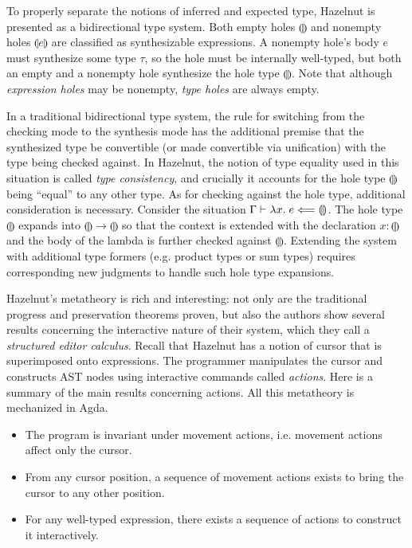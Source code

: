 \newcommand{\hole}[1]{\llparenthesis #1 \rrparenthesis}
To properly separate the notions of inferred and expected type, Hazelnut is
presented as a bidirectional type system.
Both empty holes $\hole{}$ and nonempty holes $\hole{e}$ are classified as
synthesizable expressions.
A nonempty hole's body $e$ must synthesize some type $\tau$, so the hole must be
internally well-typed, but both an empty and a nonempty hole synthesize the hole
type $\hole{}$.
Note that although \emph{expression holes} may be nonempty, \emph{type holes}
are always empty.

In a traditional bidirectional type system, the rule for switching from the
checking mode to the synthesis mode has the additional premise that the
synthesized type be convertible (or made convertible via unification) with the
type being checked against.
In Hazelnut, the notion of type equality used in this situation is called
\emph{type consistency}, and crucially it accounts for the hole type $\hole{}$
being ``equal'' to any other type.
As for checking against the hole type, additional consideration is necessary.
Consider the situation $\Gamma \proves \lambda x.\; e \chk \hole{}$.
The hole type $\hole{}$ expands into $\hole{} \to \hole{}$ so that the
context is extended with the declaration $x{:}\hole{}$ and the body of the
lambda is further checked against $\hole{}$.
Extending the system with additional type formers (e.g. product types or sum
types) requires corresponding new judgments to handle such hole type expansions.

Hazelnut's metatheory is rich and interesting: not only are the traditional
progress and preservation theorems proven, but also the authors show several
results concerning the interactive nature of their system, which they call a
\emph{structured editor calculus}.
Recall that Hazelnut has a notion of cursor that is superimposed onto
expressions.
The programmer manipulates the cursor and constructs AST nodes using interactive
commands called \emph{actions}.
Here is a summary of the main results concerning actions.
All this metatheory is mechanized in Agda.
\begin{itemize}
\item The program is invariant under movement actions, i.e. movement actions
  affect only the cursor.
\item From any cursor position, a sequence of movement actions exists
  to bring the cursor to any other position.
\item For any well-typed expression, there exists a sequence of actions to
  construct it interactively.
\end{itemize}

